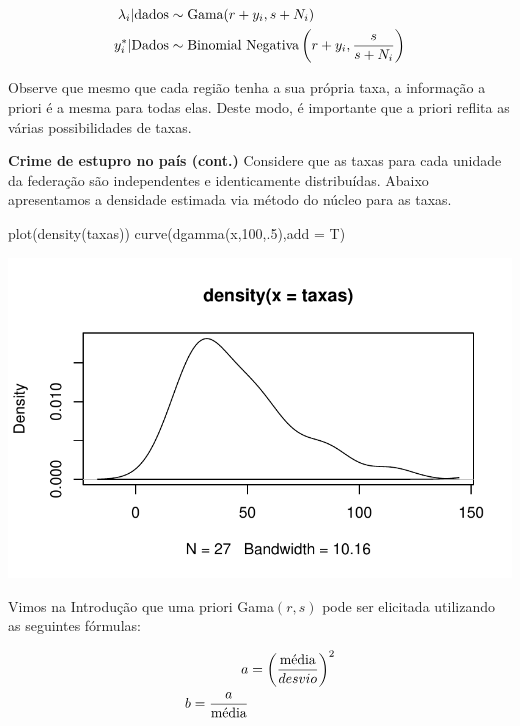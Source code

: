 \documentclass[
  letterpaper,
  DIV=11,
  numbers=noendperiod]{scrreprt}
\newenvironment{Shaded}{\begin{snugshade}}{\end{snugshade}}
\newcommand{\AttributeTok}[1]{\textcolor[rgb]{0.40,0.45,0.13}{#1}}
\newcommand{\DecValTok}[1]{\textcolor[rgb]{0.68,0.00,0.00}{#1}}
\newcommand{\FunctionTok}[1]{\textcolor[rgb]{0.28,0.35,0.67}{#1}}
\newcommand{\NormalTok}[1]{\textcolor[rgb]{0.00,0.23,0.31}{#1}}
\theoremstyle{definition}
\theoremstyle{plain}
\theoremstyle{definition}
\theoremstyle{remark}
\begin{document}
\[\begin{align}
\lambda_i| \hbox{dados} & \sim \hbox{Gama}(r+y_i,s+N_i)\\
y^*_i|\hbox{Dados}&\sim\hbox{Binomial Negativa}\left(r+y_i,\frac{s}{s+N_i}\right)
\end{align}\]

Observe que mesmo que cada região tenha a sua própria taxa, a informação
a priori é a mesma para todas elas. Deste modo, é importante que a
priori reflita as várias possibilidades de taxas.

\label{exm}
\textbf{Crime de estupro no país (cont.)} Considere que as taxas para
cada unidade da federação são independentes e identicamente
distribuídas. Abaixo apresentamos a densidade estimada via método do
núcleo para as taxas.

\begin{Shaded}
\begin{Highlighting}[]
\FunctionTok{plot}\NormalTok{(}\FunctionTok{density}\NormalTok{(taxas))}
\FunctionTok{curve}\NormalTok{(}\FunctionTok{dgamma}\NormalTok{(x,}\DecValTok{100}\NormalTok{,.}\DecValTok{5}\NormalTok{),}\AttributeTok{add =}\NormalTok{ T)}
\end{Highlighting}
\end{Shaded}

\includegraphics{poisson_files/figure-pdf/unnamed-chunk-6-1.pdf}

Vimos na Introdução que uma priori Gama\((r,s)\) pode ser elicitada
utilizando as seguintes fórmulas:

\[\begin{align}a&=\left(\frac{\hbox{média}}{desvio}\right)^2\\
b=\frac{a}{\hbox{média}}\end{align}\]
\end{document}
